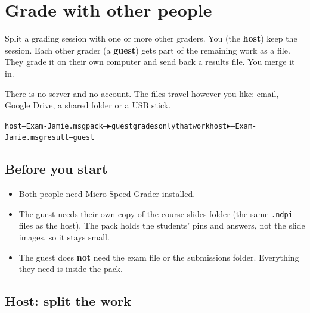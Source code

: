 \section{Grade with other people}\label{sec:handoff}

\label{sec:handoff:grade-with-other-people}

Split a grading session with one or more other graders. You (the \textbf{host}) keep the session. Each other grader (a \textbf{guest}) gets part of the remaining work as a file. They grade it on their own computer and send back a results file. You merge it in.

There is no server and no account. The files travel however you like: email, Google Drive, a shared folder or a USB stick.

\begin{codebox}\begin{alltt}
 host -- Exam - Jamie.msgpack --\ensuremath{\blacktriangleright} guest grades only that work host \ensuremath{\blacktriangleright}-- Exam - Jamie.msgresult -- guest
\end{alltt}\end{codebox}


\subsection[Before you start\alsotoc{sec:handoff:host-split-the-work}{Host: split the work}]{Before you start}\label{sec:handoff:before-you-start}

\begin{itemize}[topsep=2pt, itemsep=2pt]
\item Both people need Micro Speed Grader installed.
\item The guest needs their own copy of the course slides folder (the same \texttt{.ndpi} files as the host). The pack holds the students' pins and answers, not the slide images, so it stays small.
\item The guest does \textbf{not} need the exam file or the submissions folder. Everything they need is inside the pack.
\end{itemize}

\tocoff
\subsection{Host: split the work}\label{sec:handoff:host-split-the-work}
\tocon

